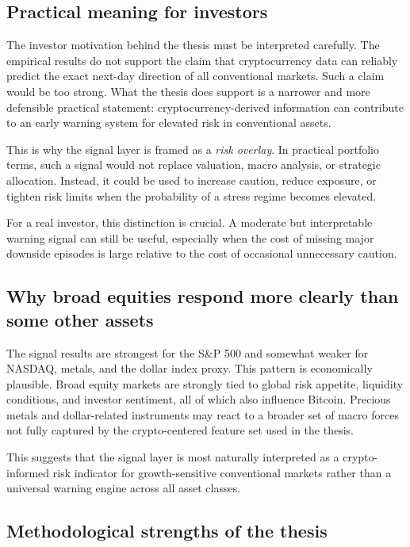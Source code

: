 \subsection{Practical meaning for investors}

The investor motivation behind the thesis must be interpreted carefully. The empirical results do not support the claim that cryptocurrency data can reliably predict the exact next-day direction of all conventional markets. Such a claim would be too strong. What the thesis does support is a narrower and more defensible practical statement: cryptocurrency-derived information can contribute to an early warning system for elevated risk in conventional assets.

This is why the signal layer is framed as a \emph{risk overlay}. In practical portfolio terms, such a signal would not replace valuation, macro analysis, or strategic allocation. Instead, it could be used to increase caution, reduce exposure, or tighten risk limits when the probability of a stress regime becomes elevated.

For a real investor, this distinction is crucial. A moderate but interpretable warning signal can still be useful, especially when the cost of missing major downside episodes is large relative to the cost of occasional unnecessary caution.

\subsection{Why broad equities respond more clearly than some other assets}

The signal results are strongest for the S\&P 500 and somewhat weaker for NASDAQ, metals, and the dollar index proxy. This pattern is economically plausible. Broad equity markets are strongly tied to global risk appetite, liquidity conditions, and investor sentiment, all of which also influence Bitcoin. Precious metals and dollar-related instruments may react to a broader set of macro forces not fully captured by the crypto-centered feature set used in the thesis.

This suggests that the signal layer is most naturally interpreted as a crypto-informed risk indicator for growth-sensitive conventional markets rather than a universal warning engine across all asset classes.

\subsection{Methodological strengths of the thesis}

